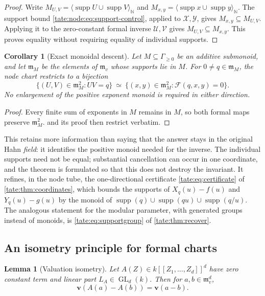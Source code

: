 \documentclass[11pt,letterpaper]{article}
\newtheorem{lemma}[lemma]{Lemma}
\newtheorem{corollary}[corollary]{Corollary}
\theoremstyle{definition}
\newcommand{\N}{\mathbb N}
\newcommand{\supp}{\operatorname{supp}}
\newcommand{\m}{\mathfrak m}
\newcommand{\GL}{\operatorname{GL}}
\newcommand{\SpanM}[1]{\langle #1\rangle_{\N}}
\newcommand{\X}{\mathcal X}
\newcommand{\Y}{\mathcal Y}
\newcommand{\UU}{\mathcal U}
\newcommand{\VV}{\mathcal V}
\newcommand{\Fp}{\mathcal F}
\newcommand{\bv}{\mathbf v}
\begin{document}
\begin{proof}
Write $M_{U,V}=\SpanM{\supp U\cup\supp V}$ and
$M_{x,y}=\SpanM{\supp x\cup\supp y}$. The support bound
\eqref{tate:node:eq:support-control}, applied to $\X,\Y$, gives
$M_{x,y}\subseteq M_{U,V}$. Applying it to the zero-constant formal
inverse $\UU,\VV$ gives $M_{U,V}\subseteq M_{x,y}$.
This proves equality without requiring equality of individual supports.
\end{proof}

\begin{corollary}[Exact monoidal descent]\label{tate:node:cor:monoidal}
Let $M\subseteq\Gamma_{\ge0}$ be an additive submonoid, and let $\m_M$ be
the elements of $\m_v$ whose supports lie in $M$. For $0\ne q\in\m_M$, the
node chart restricts to a bijection
\[
 \{(U,V)\in\m_M^2:UV=q\}
   \ \simeq\ \{(x,y)\in\m_M^2:\Fp(q,x,y)=0\}.
\]
No enlargement of the positive exponent monoid is required in either
direction.
\end{corollary}

\begin{proof}
Every finite sum of exponents in $M$ remains in $M$, so both formal maps
preserve $\m_M^2$.  and its proof then
restrict verbatim.
\end{proof}

This retains more information than saying that the answer stays in the
original Hahn \emph{field}: it identifies the positive monoid needed for the
inverse. The individual supports need not be equal; substantial
cancellation can occur in one coordinate, and the theorem is formulated so
that this does not destroy the invariant. It refines, in the node tube, the
one-directional certificate \eqref{tate:eq:certificate} of
\cref{tate:thm:coordinates}, which bounds the supports of $X_q(u)-f(u)$ and
$Y_q(u)-g(u)$ by the monoid of $\supp(q)\cup\supp(qu)\cup\supp(q/u)$. The
analogous statement for the modular parameter, with generated groups instead
of monoids, is \eqref{tate:eq:supportgroup} of \cref{tate:thm:recover}.

\subsection{An isometry principle for formal charts}

\begin{lemma}[Valuation isometry]\label{tate:node:lem:isometry}
Let $A(Z)\in k[[Z_1,\ldots,Z_d]]^d$ have zero constant term and linear part
$L_A\in\GL_d(k)$. Then for $a,b\in\m_v^d$,
\begin{equation}
 \bv(A(a)-A(b))=\bv(a-b).\label{tate:node:eq:isometry}
\end{equation}
\end{lemma}
\end{document}
